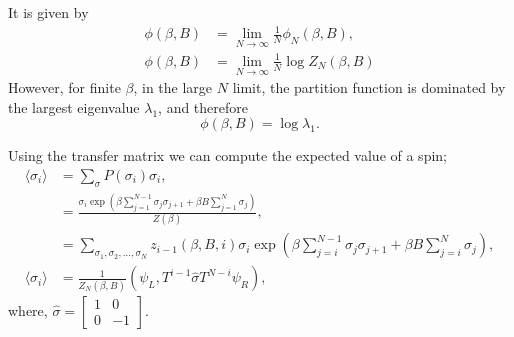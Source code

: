 \documentclass[letterpaper,english,10pt]{article}
\begin{document}
\begin{defn} It is given by 
\begin{align}
\phi(\beta,B) &= \lim \limits_{N\rightarrow\infty}\frac{1}{N}\phi_{N}(\beta,B),\nonumber\\
\phi(\beta,B) &=\lim \limits_{N\rightarrow\infty}\frac{1}{N}\log Z_{N}(\beta,B)\nonumber
\end{align}
However, for finite $\beta$, in the large $N$ limit, the partition function is dominated by the largest eigenvalue $\lambda_{1}$, and therefore 
\begin{equation}
\phi(\beta,B) = \log \lambda_{1}.
\label{lvn}
\end{equation}
\end{defn}

\begin{defn} Using the transfer matrix we can compute the expected value of a spin;
\begin{align}
\langle \sigma_{i}\rangle &= \sum_{\sigma} P(\sigma_{i})\sigma_{i},\nonumber\\
&= \frac{\sigma_{i}\exp\left(\beta\sum_{j=1}^{N-1}\sigma_{j}\sigma_{j+1}+\beta B \sum_{j=1}^{N}\sigma_{j}\right)}{Z(\beta)},\nonumber\\
&= \sum_{\sigma_{1},\sigma_{2},\ldots,\sigma_{N}}z_{i-1}(\beta,B,i)\sigma_{i}\exp\left(\beta \sum_{j=i}^{N-1}\sigma_{j}\sigma_{j+1}+\beta B \sum_{j=i}^{N}\sigma_{j}\right),\nonumber\\
\langle \sigma_{i}\rangle &= \frac{1}{Z_{N}(\beta,B)}(\psi_{L},T^{i-1}\hat{\sigma}T^{N-i}\psi_{R}),
\label{twlv}
\end{align}
where, $\hat{\sigma} = \begin{bmatrix} 1 & 0 \\ 0 & -1\end{bmatrix}$.
\end{defn}
\end{document}
